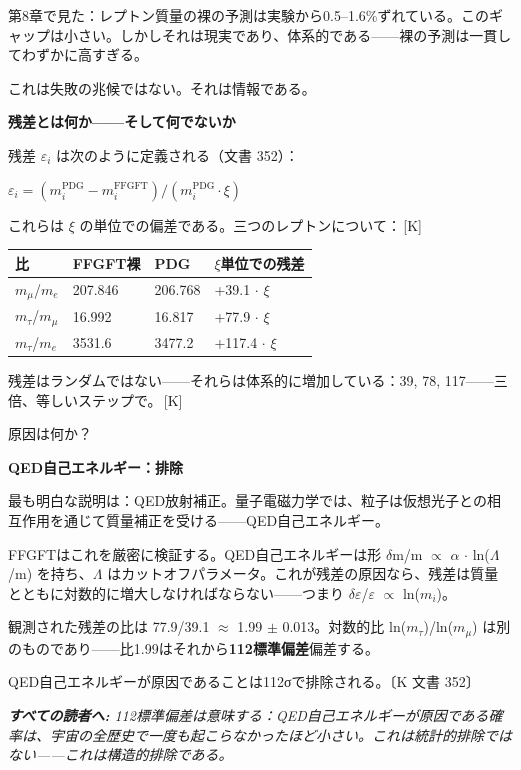 \documentclass[11pt,openany]{book}
\newcommand{\status}[1]{\penalty10000\,{\tiny\textcolor{gray!70}{[#1]}}}
\newenvironment{laierspur}{%
  \par\vspace{4pt}%
  \noindent\small\itshape\color{blue!60!black}%
  \textbf{すべての読者へ:}\enspace\ignorespaces}{%
  \par\vspace{4pt}\normalsize\normalfont\normalcolor}
\begin{document}
第8章で見た：レプトン質量の裸の予測は実験から0.5–1.6\%ずれている。このギャップは小さい。しかしそれは現実であり、体系的である——裸の予測は一貫してわずかに高すぎる。

これは失敗の兆候ではない。それは情報である。

\textbf{残差とは何か——そして何でないか}

残差 $\varepsilon_i$ は次のように定義される（文書 352）：

$\varepsilon_i = (m_i^\text{PDG} - m_i^\text{FFGFT}) / (m_i^\text{PDG} \cdot \xi)$

これらは $\xi$ の単位での偏差である。三つのレプトンについて：\status{K}

\begin{tabular}{llll}
\toprule
比 & FFGFT裸 & PDG & $\xi$単位での残差 \\
\midrule
$m_\mu$/$m_e$ & 207.846 & 206.768 & +39.1 $\cdot$ $\xi$ \\
$m_\tau$/$m_\mu$ & 16.992 & 16.817 & +77.9 $\cdot$ $\xi$ \\
$m_\tau$/$m_e$ & 3531.6 & 3477.2 & +117.4 $\cdot$ $\xi$ \\
\bottomrule
\end{tabular}

残差はランダムではない——それらは体系的に増加している：39, 78, 117——三倍、等しいステップで。\status{K}

原因は何か？

\textbf{QED自己エネルギー：排除}

最も明白な説明は：QED放射補正。量子電磁力学では、粒子は仮想光子との相互作用を通じて質量補正を受ける——QED自己エネルギー。

FFGFTはこれを厳密に検証する。QED自己エネルギーは形 $\delta$m/m $\propto$ $\alpha$ $\cdot$ ln($\Lambda$/m) を持ち、$\Lambda$ はカットオフパラメータ。これが残差の原因なら、残差は質量とともに対数的に増大しなければならない——つまり $\delta\varepsilon$/$\varepsilon$ $\propto$ ln($m_i$)。

観測された残差の比は 77.9/39.1 $\approx$ 1.99 $\pm$ 0.013。対数的比 ln($m_\tau$)/ln($m_\mu$) は別のものであり——比1.99はそれから\textbf{112標準偏差}偏差する。

QED自己エネルギーが原因であることは112σで排除される。〔K 文書 352〕

\begin{laierspur}
112標準偏差は意味する：QED自己エネルギーが原因である確率は、宇宙の全歴史で一度も起こらなかったほど小さい。これは統計的排除ではない——これは構造的排除である。
\end{laierspur}
\end{document}
